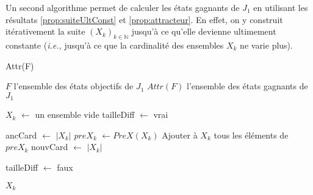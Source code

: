 Un second algorithme permet de calculer les états gagnants de $J_{1}$ en utilisant les résultats \ref{prop:suiteUltConst} et \ref{prop:attracteur}. En effet, on y construit itérativement la suite $(X_{k})_{k \in \mathbb{N}}$ jusqu'à ce qu'elle devienne ultimement constante (\emph{i.e.,} jusqu'à ce que la cardinalité des ensembles $X_{k}$ ne varie plus).

\begin{algorithm}
	\caption{Attr(F)}
	\begin{algorithmic}[1]
		\REQUIRE $F$ l'ensemble des états objectifs de $J_{1}$
		\ENSURE $Attr(F)$ l'ensemble des états gagnants de $J_{1}$
		
		\STATE $X_{k}$ $\leftarrow$ un ensemble vide
		\STATE tailleDiff $\leftarrow$ vrai
		
			\STATE ancCard $\leftarrow$ $|X_{k}|$
			\STATE $preX_{k}$ $\leftarrow PreX(X_{k})$
			\STATE Ajouter à $X_{k}$ tous les éléments de $preX_{k}$
			\STATE nouvCard $\leftarrow$ $|X_{k}|$
			
				\STATE tailleDiff $\leftarrow$ faux
			\ENDIF
		\ENDWHILE
		
		\RETURN $X_{k}$
\end{algorithmic}
\end{algorithm}

\clearpage


